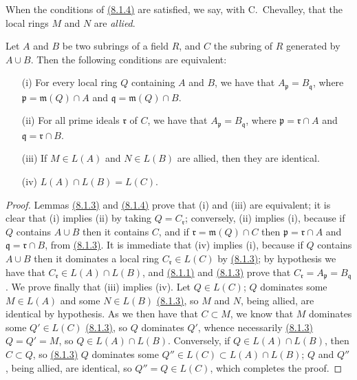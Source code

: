 When the conditions of \hyperref[lem-1.8.1.4]{(8.1.4)} are satisfied, we say, with C.~Chevalley,
that the local rings $M$ and $N$ are {\em allied}.

\begin{prop}[8.1.5]
\label{prop-1.8.1.5}
Let $A$ and $B$ be two subrings of a field $R$,
and $C$ the subring of $R$ generated by $A\cup B$. Then the following
conditions are equivalent:
\begin{itemize}
  \item[{\rm(i)}] For every local ring $Q$ containing $A$ and $B$, we have that
    $A_\mathfrak{p}=B_\mathfrak{q}$, where $\mathfrak{p}=\mathfrak{m}(Q)\cap A$ and
    $\mathfrak{q}=\mathfrak{m}(Q)\cap B$.
  \item[{\rm(ii)}] For all prime ideals $\mathfrak{r}$ of $C$, we have that
    $A_\mathfrak{p}=B_\mathfrak{q}$, where $\mathfrak{p}=\mathfrak{r}\cap A$ and
    $\mathfrak{q}=\mathfrak{r}\cap B$.
  \item[{\rm(iii)}] If $M\in L(A)$ and $N\in L(B)$ are allied, then they are identical.
  \item[{\rm(iv)}] $L(A)\cap L(B)=L(C)$.
\end{itemize}
\end{prop}

\begin{proof}
\label{proof-prop-1.8.1.5}
Lemmas \hyperref[lem-1.8.1.3]{(8.1.3)} and \hyperref[lem-1.8.1.4]{(8.1.4)} prove that (i) and (iii) are equivalent; it
is clear that (i) implies (ii) by taking $Q=C_\mathfrak{r}$; conversely, (ii)
implies (i), because if $Q$ contains $A\cup B$ then it contains $C$, and if
$\mathfrak{r}=\mathfrak{m}(Q)\cap C$ then $\mathfrak{p}=\mathfrak{r}\cap A$ and
$\mathfrak{q}=\mathfrak{r}\cap B$, from \hyperref[lem-1.8.1.3]{(8.1.3)}. It is immediate that (iv)
implies (i), because if $Q$ contains $A\cup B$ then it dominates a local ring
$C_\mathfrak{r}\in L(C)$ by \hyperref[lem-1.8.1.3]{(8.1.3)}; by hypothesis we have that
$C_\mathfrak{r}\in L(A)\cap L(B)$, and \hyperref[lem-1.8.1.1]{(8.1.1)} and \hyperref[lem-1.8.1.3]{(8.1.3)} prove that
$C_\mathfrak{r}=A_\mathfrak{p}=B_\mathfrak{q}$. We prove finally that (iii)
implies (iv). Let $Q\in L(C)$; $Q$ dominates some $M\in L(A)$ and some $N\in
L(B)$ \hyperref[lem-1.8.1.3]{(8.1.3)}, so $M$ and $N$, being allied, are identical by hypothesis.
As we then have that $C\subset M$, we know that $M$ dominates some $Q'\in L(C)$
\hyperref[lem-1.8.1.3]{(8.1.3)}, so $Q$ dominates $Q'$, whence necessarily \hyperref[lem-1.8.1.3]{(8.1.3)} $Q=Q'=M$,
so $Q\in L(A)\cap L(B)$. Conversely, if $Q\in L(A)\cap L(B)$, then $C\subset
Q$, so \hyperref[lem-1.8.1.3]{(8.1.3)} $Q$ dominates some $Q''\in L(C)\subset L(A)\cap L(B)$; $Q$
and $Q''$, being allied, are identical, so $Q''=Q\in L(C)$, which completes the
proof.
\end{proof}

